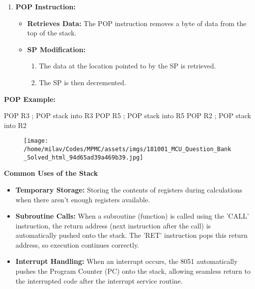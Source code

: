 \documentclass[
]{article}
\newenvironment{Shaded}{}{}
\newcommand{\NormalTok}[1]{#1}
\begin{document}
\begin{enumerate}
\def\labelenumi{\arabic{enumi}.}
\item
  \textbf{POP Instruction:}

  \begin{itemize}
  \item
    \textbf{Retrieves Data:} The POP instruction removes a byte of data
    from the top of the stack.
  \item
    \textbf{SP Modification:}

    \begin{enumerate}
    \def\labelenumii{\arabic{enumii}.}
    \item
      The data at the location pointed to by the SP is retrieved.
    \item
      The SP is then decremented.
    \end{enumerate}
  \end{itemize}
\end{enumerate}

\textbf{POP Example:}

\begin{Shaded}
\begin{Highlighting}[]
\NormalTok{POP R3 ; POP stack into R3}
\NormalTok{POP R5 ; POP stack into R5}
\NormalTok{POP R2 ; POP stack into R2}
\end{Highlighting}
\end{Shaded}

\begin{figure}
\centering
\texttt{[image: /home/milav/Codes/MPMC/assets/imgs/181001\_MCU\_Question\_Bank\_Solved\_html\_94d65ad39a469b39.jpg]}
\caption{}
\end{figure}

\textbf{Common Uses of the Stack}

\begin{itemize}
\item
  \textbf{Temporary Storage:} Storing the contents of registers during
  calculations when there aren't enough registers available.
\item
  \textbf{Subroutine Calls:} When a subroutine (function) is called
  using the 'CALL' instruction, the return address (next instruction
  after the call) is automatically pushed onto the stack. The 'RET'
  instruction pops this return address, so execution continues
  correctly.
\item
  \textbf{Interrupt Handling:} When an interrupt occurs, the 8051
  automatically pushes the Program Counter (PC) onto the stack, allowing
  seamless return to the interrupted code after the interrupt service
  routine.
\end{itemize}
\end{document}
